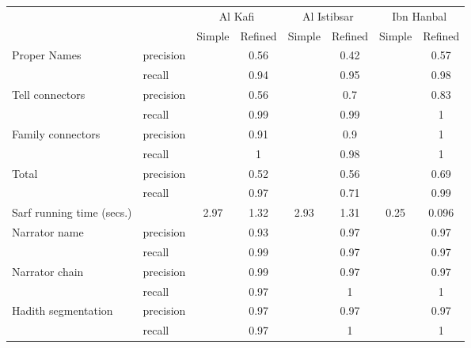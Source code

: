 \begin{table}
\begin{minipage}{\textwidth}
 {    
    \begin{tabular}{llcccccc}
\hline \hline
          &       & \multicolumn{2}{c}{Al Kafi} & \multicolumn{2}{c}{Al Istibsar} & \multicolumn{2}{c}{Ibn Hanbal} \\
\cline{3-8}
          &       & Simple & Refined & Simple & Refined & Simple & Refined \\ \hline
    \multicolumn{1}{l}{\multirow{2}[0]{*}{Proper Names}} & precision &       & 0.56  &       & 0.42  &       & 0.57 \\
    \multicolumn{1}{l}{} & recall &       & 0.94  &       & 0.95  &       & 0.98 \\ \hline
    \multicolumn{1}{l}{\multirow{2}[0]{*}{Tell connectors}} & precision &       & 0.56  &       & 0.7   &       & 0.83 \\
    \multicolumn{1}{l}{} & recall &       & 0.99  &       & 0.99  &       & 1 \\ \hline
    \multicolumn{1}{l}{\multirow{2}[0]{*}{Family connectors}} & precision &       & 0.91  &       & 0.9   &       & 1 \\
    \multicolumn{1}{l}{} & recall &       & 1     &       & 0.98  &       & 1 \\ \hline
    \multicolumn{1}{l}{\multirow{2}[0]{*}{Total}} & precision &       & 0.52  &       & 0.56  &       & 0.69 \\
    \multicolumn{1}{l}{} & recall &       & 0.97  &       & 0.71  &       & 0.99 \\ \hline
    Sarf running time (secs.) &       & 2.97  & 1.32  & 2.93  & 1.31  & 0.25  & 0.096 \\ \hline
    \multicolumn{1}{l}{\multirow{2}[0]{*}{Narrator name}} & precision &       & 0.93  &       & 0.97  &       & 0.97 \\
    \multicolumn{1}{l}{} & recall &       & 0.99  &       & 0.97  &       & 0.97 \\
    \multicolumn{1}{l}{\multirow{2}[0]{*}{Narrator chain}} & precision &       & 0.99  &       & 0.97  &       & 0.97 \\
    \multicolumn{1}{l}{} & recall &       & 0.97  &       & 1     &       & 1 \\
    \multicolumn{1}{l}{\multirow{2}[0]{*}{Hadith segmentation}} & precision &       & 0.97  &       & 0.97  &       & 0.97 \\
    \multicolumn{1}{l}{} & recall &       & 0.97  &       & 1     &       & 1 \\ \hline

\end{tabular}}
\end{minipage}
\end{table}
